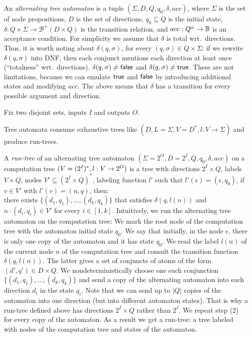 An \emph{alternating tree automaton} is a tuple
$(\Sigma, D, Q, q_0, \delta, acc)$,
where $\Sigma$ is the set of node propositions,
$D$ is the set of directions, $q_0 \subseteq Q$ is the initial state,
$\delta: Q \times \Sigma \to \mathcal{B}^+(D \times Q)$
is the transition relation,
and $acc: Q^\omega \to \mathbb{B}$ is an acceptance condition.
For simplicity we assume that $\delta$ is total wrt.\ directions.
Thus, it is worth noting about $\delta(q,\sigma)$, for every $(q,\sigma) \in Q\times\Sigma$:
\li
\- if we rewrite $\delta(q,\sigma)$ into DNF,
   then each conjunct mentions each direction at least once (``totalness'' wrt.\ directions).
\- $\delta(q,\sigma) \neq \textsf{false}$ and $\delta(q,\sigma) \neq \textsf{true}$.
   These are not limitations,
   because we can emulate $\textsf{true}$ and $\textsf{false}$ by introducing additional states and modifying $acc$.
\il
The above means that $\delta$ has a transition for every possible argument and direction.

Fix two disjoint sets, inputs $I$ and outputs $O$.

Tree automata consume exhaustive trees like $(D, L=\Sigma, V=D^*, l:V \to \Sigma)$
and produce run-trees.

A \emph{run-tree} of an alternating tree automaton
$(\Sigma=2^O, D=2^I, Q, q_0, \delta, acc)$
on a computation tree $(V=(2^I)^*, l:V \to {2^O})$
is a tree
with directions $2^I \times Q$,
labels $V \times Q$,
nodes $V' \subseteq (2^I \times Q)^*$,
labeling function $l'$
such that
\li
\- $l'(\epsilon) = (\epsilon, q_0)$,
\- if $v \in V'$ with $l'(v) = (n,q)$, then:\\
   there exists $\{(d_1,q_1),...,(d_k,q_k)\}$ that satisfies $\delta(q, l(n))$
   and $n \cdot (d_i, q_i) \in V'$ for every $i \in [1,k]$.
\il
Intuitively,
we run the alternating tree automaton on the computation tree:
\li
\-[(1)]
   We mark the root node of the computation tree with the automaton initial state $q_0$.
   We say that initially, in the node $\epsilon$,
   there is only one copy of the automaton and it has state $q_0$.
\-[(2)]
   We read the label $l(n)$ of the current node $n$ of the computation tree
   and consult the transition function $\delta(q,l(n))$.
   The latter gives a set of conjuncts of atoms of the form $(d',q') \in D\times Q$.
   We nondeterministically choose one such conjunction $\{(d_1,q_1), ..., (d_k,q_k)\}$
   and send a copy of the alternating automaton into each direction $d_i$ in the state $q_i$.
   Note that we can send up to $|Q|$ copies of the automaton into one direction
   (but into different automaton states).
   That is why a run-tree defined above has directions $2^I\times Q$
   rather than $2^I$.
\-[(3)]
   We repeat step (2) for every copy of the automaton.
   As a result we get a run-tree:
   a tree labeled with nodes of the computation tree and
   states of the automaton.
\il

